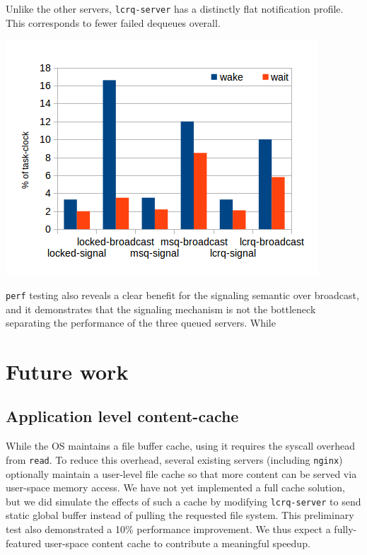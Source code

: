 \documentclass[twoside,10pt]{article}
\newenvironment{Figure}
  {\par\medskip\noindent\minipage{\linewidth}}
  {\endminipage\par\medskip}
\begin{document}
\begin{multicols}{2}
Unlike the other servers, \verb+lcrq-server+ has a distinctly flat
notification profile. This corresponds to fewer failed dequeues
overall.

\begin{Figure}
\includegraphics[width=\linewidth]{img/signal-broadcast-8.png}
\label{fig:perf-latency-nthreads}
\end{Figure}

\verb+perf+ testing also reveals a clear benefit for the signaling
semantic over broadcast, and it demonstrates that the signaling
mechanism is not the bottleneck separating the performance of the
three queued servers. While

\section{Future work}

\subsection{Application level content-cache}
\label{app-cache}
While the OS maintains a file buffer cache, using it requires the
syscall overhead from \verb+read+. To reduce this overhead, several
existing servers (including \verb+nginx+) optionally maintain a
user-level file cache so that more content can be served via
user-space memory access. We have not yet implemented a full cache
solution, but we did simulate the effects of such a cache by modifying
\verb+lcrq-server+ to send static global buffer instead of pulling the
requested file system. This preliminary test also demonstrated a 10\%
performance improvement. We thus expect a fully-featured user-space
content cache to contribute a meaningful speedup.


\end{multicols}
\end{document}

